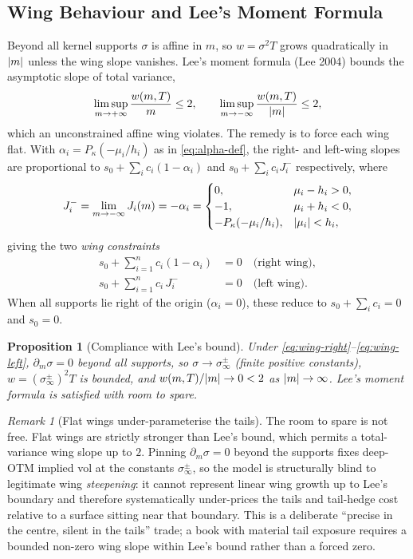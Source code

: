 \documentclass[11pt]{book}
\theoremstyle{plain}
\newtheorem{proposition}[theorem]{Proposition}
\theoremstyle{definition}
\theoremstyle{remark}
\newtheorem{remark}[theorem]{Remark}
\newcommand{\mln}{m}                             %
\DeclarePairedDelimiter{\abs}{\lvert}{\rvert}
\begin{document}
\subsection{Wing Behaviour and Lee's Moment Formula}
\label{sec:wings}

Beyond all kernel supports $\sigma$ is affine in $\mln$, so $w = \sigma^2 T$
grows quadratically in $\abs{\mln}$ unless the wing slope vanishes. Lee's moment
formula (Lee 2004) bounds the asymptotic slope of total variance,
\[
\limsup_{\mln\to+\infty}\frac{w(\mln,T)}{\mln}\le 2,
\qquad
\limsup_{\mln\to-\infty}\frac{w(\mln,T)}{\abs{\mln}}\le 2,
\]
which an unconstrained affine wing violates. The remedy is to force each wing
flat. With $\alpha_i = P_\kappa(-\mu_i/h_i)$ as in \eqref{eq:alpha-def}, the
right- and left-wing slopes are proportional to $s_0 + \sum_i c_i(1-\alpha_i)$
and $s_0 + \sum_i c_i J_i^{-}$ respectively, where
\[
J_i^{-} = \lim_{\mln\to-\infty}J_i(\mln) = -\alpha_i =
\begin{cases}
0, & \mu_i - h_i > 0,\\
-1, & \mu_i + h_i < 0,\\
-P_\kappa(-\mu_i/h_i), & \abs{\mu_i} < h_i,
\end{cases}
\]
giving the two \emph{wing constraints}
\begin{align}
s_0 + \sum_{i=1}^n c_i(1-\alpha_i) &= 0 \quad\text{(right wing)},
\label{eq:wing-right}\\
s_0 + \sum_{i=1}^n c_i\,J_i^{-} &= 0 \quad\text{(left wing)}.
\label{eq:wing-left}
\end{align}
When all supports lie right of the origin ($\alpha_i = 0$), these reduce to
$s_0 + \sum_i c_i = 0$ and $s_0 = 0$.

\begin{proposition}[Compliance with Lee's bound]\label{prop:lee}
Under \eqref{eq:wing-right}--\eqref{eq:wing-left}, $\partial_\mln\sigma = 0$
beyond all supports, so $\sigma\to\sigma_\infty^{\pm}$ (finite positive
constants), $w = (\sigma_\infty^{\pm})^2 T$ is bounded, and
$w(\mln,T)/\abs{\mln}\to 0 < 2$ as $\abs{\mln}\to\infty$. Lee's moment formula is
satisfied with room to spare.
\end{proposition}

\begin{remark}[Flat wings under-parameterise the tails]\label{rem:flat-wing-cost}
The room to spare is not free. Flat wings are strictly stronger than Lee's
bound, which permits a total-variance wing slope up to $2$. Pinning
$\partial_\mln\sigma=0$ beyond the supports fixes deep-OTM implied vol at the
constants $\sigma_\infty^{\pm}$, so the model is structurally blind to
legitimate wing \emph{steepening}: it cannot represent linear wing growth up to
Lee's boundary and therefore systematically under-prices the tails and
tail-hedge cost relative to a surface sitting near that boundary. This is a
deliberate ``precise in the centre, silent in the tails'' trade; a book with
material tail exposure requires a bounded non-zero wing slope within
Lee's bound rather than a forced zero.
\end{remark}
\end{document}
